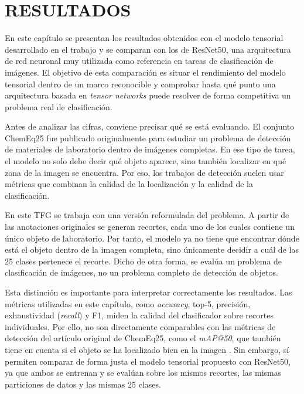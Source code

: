 \chapter{RESULTADOS}\label{sec:Resultados}

En este capítulo se presentan los resultados obtenidos con el modelo tensorial desarrollado en el trabajo y se comparan con los de ResNet50, una arquitectura de red neuronal muy utilizada como referencia en tareas de clasificación de imágenes. El objetivo de esta comparación es situar el rendimiento del modelo tensorial dentro de un marco reconocible y comprobar hasta qué punto una arquitectura basada en \textit{tensor networks} puede resolver de forma competitiva un problema real de clasificación.

Antes de analizar las cifras, conviene precisar qué se está evaluando. El conjunto ChemEq25 fue publicado originalmente para estudiar un problema de detección de materiales de laboratorio dentro de imágenes completas. En ese tipo de tarea, el modelo no solo debe decir qué objeto aparece, sino también localizar en qué zona de la imagen se encuentra. Por eso, los trabajos de detección suelen usar métricas que combinan la calidad de la localización y la calidad de la clasificación.

En este TFG se trabaja con una versión reformulada del problema. A partir de las anotaciones originales se generan recortes, cada uno de los cuales contiene un único objeto de laboratorio. Por tanto, el modelo ya no tiene que encontrar dónde está el objeto dentro de la imagen completa, sino únicamente decidir a cuál de las 25 clases pertenece el recorte. Dicho de otra forma, se evalúa un problema de clasificación de imágenes, no un problema completo de detección de objetos.

Esta distinción es importante para interpretar correctamente los resultados. Las métricas utilizadas en este capítulo, como \textit{accuracy}, top-5, precisión, exhaustividad (\textit{recall}) y F1, miden la calidad del clasificador sobre recortes individuales. Por ello, no son directamente comparables con las métricas de detección del artículo original de ChemEq25, como el \textit{mAP@50}, que también tiene en cuenta si el objeto se ha localizado bien en la imagen . Sin embargo, sí permiten comparar de forma justa el modelo tensorial propuesto con ResNet50, ya que ambos se entrenan y se evalúan sobre los mismos recortes, las mismas particiones de datos y las mismas 25 clases.

